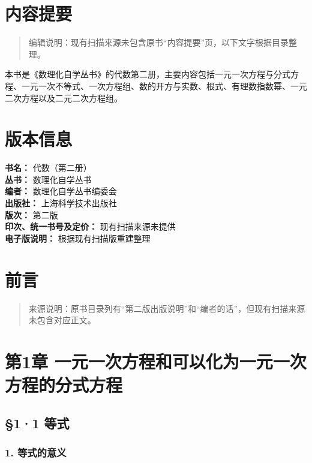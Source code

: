 \chapter*{内容提要}

\begin{quote}
编辑说明：现有扫描来源未包含原书``内容提要''页，以下文字根据目录整理。
\end{quote}

本书是《数理化自学丛书》的代数第二册，主要内容包括一元一次方程与分式方程、一元一次不等式、一次方程组、数的开方与实数、根式、有理数指数幂、一元二次方程以及二元二次方程组。

\chapter*{版本信息}

\begin{flushleft}
\textbf{书名：} 代数（第二册）\\
\textbf{丛书：} 数理化自学丛书\\
\textbf{编者：} 数理化自学丛书编委会\\
\textbf{出版社：} 上海科学技术出版社\\
\textbf{版次：} 第二版\\
\textbf{印次、统一书号及定价：} 现有扫描来源未提供\\
\textbf{电子版说明：} 根据现有扫描版重建整理
\end{flushleft}

\chapter{前言}

\begin{quote}
来源说明：原书目录列有``第二版出版说明''和``编者的话''，但现有扫描来源未包含对应正文。
\end{quote}

\chapter{第1章 一元一次方程和可以化为一元一次方程的分式方程}

\section{§1·1 等式}

\subsection{1. 等式的意义}

